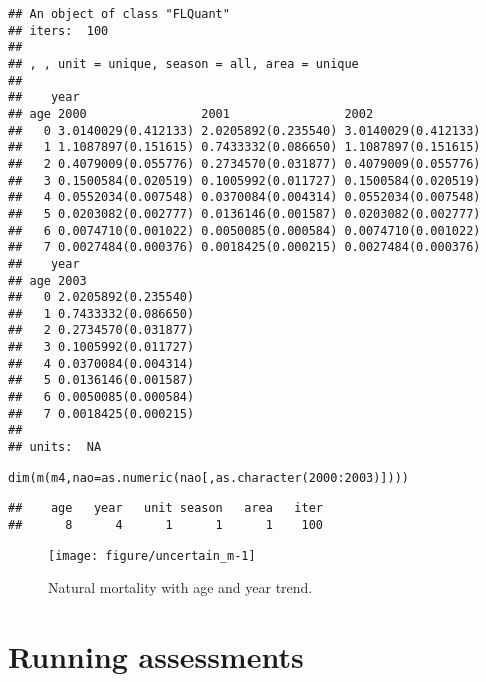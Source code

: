 \documentclass[a4paper,english,10pt]{article}\usepackage[]{graphicx}\usepackage[]{color}
\makeatletter
\def\maxwidth{ %
  \ifdim\Gin@nat@width>\linewidth
    \linewidth
  \else
    \Gin@nat@width
  \fi
}
\newcommand{\hlnum}[1]{\textcolor[rgb]{0.2,0.2,0.2}{#1}}%
\newcommand{\hlopt}[1]{\textcolor[rgb]{0.2,0.2,0.2}{#1}}%
\newcommand{\hlstd}[1]{\textcolor[rgb]{0,0,0}{#1}}%
\newcommand{\hlkwc}[1]{\textcolor[rgb]{0.361,0.506,0.596}{#1}}%
\newcommand{\hlkwd}[1]{\textcolor[rgb]{0.361,0.506,0.596}{#1}}%
\newenvironment{kframe}{%
 \def\at@end@of@kframe{}%
 \ifinner\ifhmode%
  \def\at@end@of@kframe{\end{minipage}}%
  \begin{minipage}{\columnwidth}%
 \fi\fi%
 \def\FrameCommand##1{\hskip\@totalleftmargin \hskip-\fboxsep
 \colorbox{shadecolor}{##1}\hskip-\fboxsep
     \hskip-\linewidth \hskip-\@totalleftmargin \hskip\columnwidth}%
 \MakeFramed {\advance\hsize-\width
   \@totalleftmargin\z@ \linewidth\hsize
   \@setminipage}}%
 {\par\unskip\endMakeFramed%
 \at@end@of@kframe}
\newenvironment{knitrout}{}{} %
\makeatother
\begin{document}
\begin{knitrout}
\begin{kframe}
\begin{verbatim}
## An object of class "FLQuant"
## iters:  100 
## 
## , , unit = unique, season = all, area = unique
## 
##    year
## age 2000                2001                2002               
##   0 3.0140029(0.412133) 2.0205892(0.235540) 3.0140029(0.412133)
##   1 1.1087897(0.151615) 0.7433332(0.086650) 1.1087897(0.151615)
##   2 0.4079009(0.055776) 0.2734570(0.031877) 0.4079009(0.055776)
##   3 0.1500584(0.020519) 0.1005992(0.011727) 0.1500584(0.020519)
##   4 0.0552034(0.007548) 0.0370084(0.004314) 0.0552034(0.007548)
##   5 0.0203082(0.002777) 0.0136146(0.001587) 0.0203082(0.002777)
##   6 0.0074710(0.001022) 0.0050085(0.000584) 0.0074710(0.001022)
##   7 0.0027484(0.000376) 0.0018425(0.000215) 0.0027484(0.000376)
##    year
## age 2003               
##   0 2.0205892(0.235540)
##   1 0.7433332(0.086650)
##   2 0.2734570(0.031877)
##   3 0.1005992(0.011727)
##   4 0.0370084(0.004314)
##   5 0.0136146(0.001587)
##   6 0.0050085(0.000584)
##   7 0.0018425(0.000215)
## 
## units:  NA
\end{verbatim}
\begin{alltt}
\hlkwd{dim}\hlstd{(}\hlkwd{m}\hlstd{(m4,} \hlkwc{nao}\hlstd{=}\hlkwd{as.numeric}\hlstd{(nao[,}\hlkwd{as.character}\hlstd{(}\hlnum{2000}\hlopt{:}\hlnum{2003}\hlstd{)])))}
\end{alltt}
\begin{verbatim}
##    age   year   unit season   area   iter 
##      8      4      1      1      1    100
\end{verbatim}
\end{kframe}
\end{knitrout}

\begin{knitrout}
\color{fgcolor}\begin{figure}[H]

{\centering \texttt{[image: figure/uncertain\_m-1]} 

}

\caption[Natural mortality with age and year trend]{Natural mortality with age and year trend.}\label{fig:uncertain_m}
\end{figure}


\end{knitrout}

\pagebreak
\section{Running assessments}\label{sec:sca}
\end{document}
